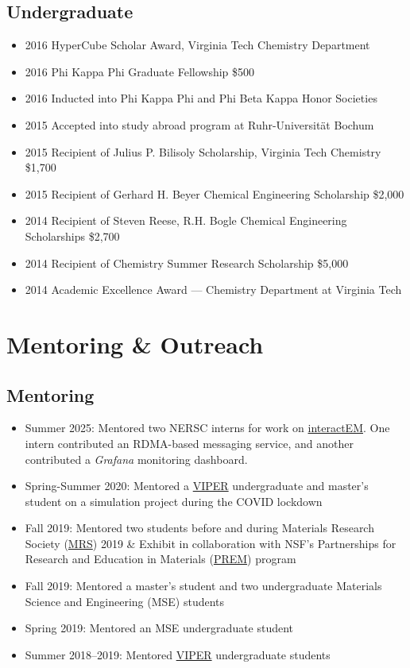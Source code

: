 \documentclass[11pt]{article} %
\begin{document}
\subsection*{Undergraduate}
\begin{itemize}
  \item 2016 HyperCube Scholar Award, Virginia Tech Chemistry Department
  \item 2016 Phi Kappa Phi Graduate Fellowship \hfill \$500
  \item 2016 Inducted into Phi Kappa Phi and Phi Beta Kappa Honor Societies
  \item 2015 Accepted into study abroad program at Ruhr-Universität Bochum
  \item 2015 Recipient of Julius P. Bilisoly Scholarship, Virginia Tech Chemistry \hfill \$1,700
  \item 2015 Recipient of Gerhard H. Beyer Chemical Engineering Scholarship \hfill \$2,000
  \item 2014 Recipient of Steven Reese, R.H. Bogle Chemical Engineering Scholarships \hfill \$2,700
  \item 2014 Recipient of Chemistry Summer Research Scholarship \hfill \$5,000
  \item 2014 Academic Excellence Award --- Chemistry Department at Virginia Tech
\end{itemize}

\section{Mentoring \& Outreach}
\subsection{Mentoring}
\begin{itemize}
  \item Summer 2025: Mentored two NERSC interns for work on \href{https://github.com/NERSC/interactEM}{interactEM}. One intern contributed an RDMA-based messaging service, and another contributed a \textit{Grafana} monitoring dashboard.
  \item Spring-Summer 2020: Mentored a \href{https://www.viper.upenn.edu/}{VIPER} undergraduate and master's student on a simulation project during the COVID lockdown
  \item Fall 2019: Mentored two students before and during Materials Research Society (\href{https://www.mrs.org/}{MRS}) 2019 \& Exhibit in collaboration with NSF's Partnerships for Research and Education in Materials (\href{https://new.nsf.gov/funding/opportunities/prem-partnerships-research-education-materials}{PREM}) program
  \item Fall 2019: Mentored a master's student and two undergraduate Materials Science and Engineering (MSE) students
  \item Spring 2019: Mentored an MSE undergraduate student
  \item Summer 2018--2019: Mentored \href{https://www.viper.upenn.edu/}{VIPER} undergraduate students
\end{itemize}
\end{document}
